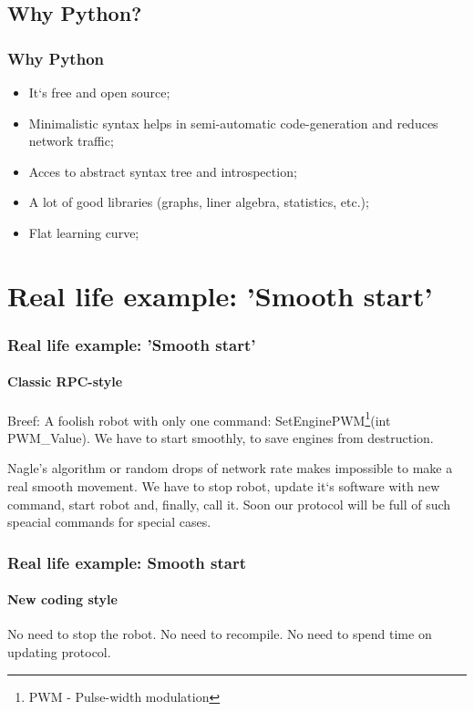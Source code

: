\documentclass{beamer}
\begin{document}
\subsection{Why Python?}
\begin{frame}
\frametitle{Why Python}
\begin{itemize}
  \item<1> It`s free and open source;
  \item<1> Minimalistic syntax helps in semi-automatic code-generation and reduces network traffic;
  \item<1> Acces to abstract syntax tree and introspection; 
  \item<1> A lot of good libraries (graphs, liner algebra, statistics, etc.);
  \item<1> Flat learning curve;  
\end{itemize}
\end{frame}

\section{Real life example: 'Smooth start'}

\begin{frame}
\frametitle{Real life example: 'Smooth start'}
\framesubtitle{\textbf{Classic RPC-style}}
Breef: A foolish robot with only one command: SetEnginePWM\footnote{PWM - Pulse-width modulation}(int PWM\_Value).
We have to start smoothly, to save engines from destruction. 


Nagle's algorithm or random drops of network rate makes impossible to make a real smooth movement.
We have to stop robot, update it`s software with new command, start robot and, finally, call it. Soon our protocol will be full of
such speacial commands for special cases.
\end{frame}

\begin{frame}
\frametitle{Real life example: Smooth start}
\framesubtitle{\textbf{New coding style}}

No need to stop the robot. No need to recompile. No need to spend time on updating protocol.

\end{frame}
\end{document}
